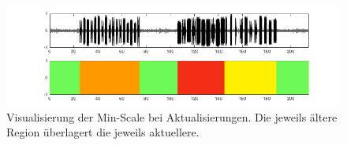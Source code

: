 \begin{itemize}
\begin{figure}[h]
	\centering
	\includegraphics[width=1\textwidth]{bilder/viz_act_under_02.png}
	\caption{Visualisierung der Min-Scale bei Aktualisierungen. Die jeweils \glqq ältere\grqq{} Region überlagert die jeweils \glqq aktuellere\grqq{}.}
	\label{fig:viz_act_under}
\end{figure}
 
\end{itemize}

